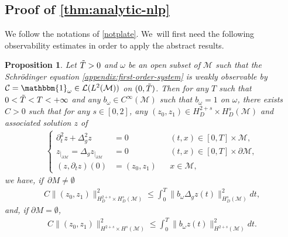 \documentclass[10pt]{amsart}
\newtheorem{proposition}[theorem]{Proposition}
\theoremstyle{definition}
\let\mc\mathcal
\newcommand{\M}{\mc{M}}
\providecommand{\norm}[1]{\lVert#1\rVert}
\begin{document}
\subsection{Proof of \cref{thm:analytic-nlp}}
We follow the notations of \cref{notplate}. We~will first need the following observability estimates in order to apply the abstract results.
\begin{proposition}\label{prop:obs-plate}
Let $\Tilde{T}>0$ and $\omega$ be an open subset of $\M$ such that the Schrödinger equation
\eqref{appendix:first-order-system} is weakly observable by $\mc{C}=\mathbbm{1}_{\omega}\in \mc{L}( L^2(\M))$ on $(0, \Tilde{T})$. Then for any $T$ such that $0<\Tilde{T}<T<+\infty$ and any $b_{\omega}\in C^{\infty}(\M)$ such that $b_{\omega}=1$ on $\omega$, there exists $C>0$ such that for any $s\in [0,2]$, any $(z_0, z_1)\in H_D^{2+s}\times H^s_D(\M)$ and associated solution $z$ of
\begin{align*}
\left\{\begin{aligned}
\partial_t^2 z+\Delta_g^2 z&=0 &&(t, x)\in [0, T]\times \M,\\
z_{|_{\partial\M}}=\Delta_g z_{|_{\partial\M}}&=0 &&(t, x)\in [0, T]\times\partial\M,\\
(z, \partial_t z)(0)&=(z_0, z_1) &&x\in \M,
\end{aligned}\right.
\end{align*}
we have, if~$\partial M\neq \emptyset$
\begin{align}\label{thm:ineq:obs-plate-1}
C\norm{(z_0, z_1)}_{H^{2+s}_D\times H^s_D(\M)}^2\leq \int_0^T \norm{b_\omega \Delta_g z(t)}_{H^s_D(\M)}^2 dt,
\end{align}
and, if $\partial M= \emptyset$,
\begin{align}\label{thm:ineq:obs-plate-1bis}
C\norm{(z_0, z_1)}_{H^{2+s}\times H^s(\M)}^2\leq \int_0^T \norm{b_\omega z(t)}_{H^{2+s}(\M)}^2 dt.
\end{align}
\end{proposition}
\end{document}
